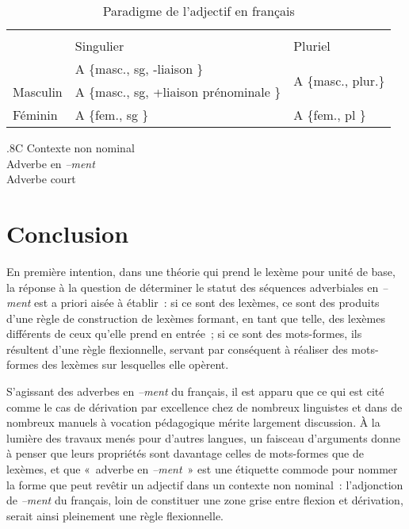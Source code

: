 \documentclass[output=paper]{langsci/langscibook}
\begin{document}
\begin{table}
  \centering
\begin{tabularx}{.8\textwidth}{Xll}
\lsptoprule
\multicolumn{3}{c}{Contexte nominal} \\
 & Singulier & Pluriel \\
\midrule
  & A \{masc., sg, -liaison \}& \multirow{2}{*}{A \{masc., plur.\}} \\
\multirow{-2}{*}{Masculin}& A \{masc., sg, +liaison prénominale \}& \\
\tablevspace
Féminin & A \{fem., sg \}& A \{fem., pl \} \\
\midrule
\end{tabularx}
\begin{tabularx}{.8\textwidth}{C}
\midrule
  Contexte non nominal \\
  \midrule
  Adverbe en \emph{--ment} \\
  Adverbe court \\
  \lspbottomrule
\end{tabularx}
\caption{Paradigme de l'adjectif en français}
\label{tab:Dal:4}
\end{table}

\section{Conclusion}

En première intention, dans une théorie qui prend le lexème pour unité de base, la réponse à la question de déterminer le statut des séquences adverbiales en \emph{--ment} est a priori aisée à établir~: si ce sont des lexèmes, ce sont des produits d'une règle de construction de lexèmes formant, en tant que telle, des lexèmes différents de ceux qu'elle prend en entrée~; si ce sont des mots-formes, ils résultent d'une règle flexionnelle, servant par conséquent à réaliser des mots-formes des lexèmes sur lesquelles elle opèrent.

S'agissant des adverbes en \emph{--ment} du français, il est apparu que ce qui est cité comme le cas de dérivation par excellence chez de nombreux linguistes et dans de nombreux manuels à vocation pédagogique mérite largement discussion. À la lumière des travaux menés pour d'autres langues, un faisceau d'arguments donne à penser que leurs propriétés sont davantage celles de mots-formes que de lexèmes, et que «~adverbe en \emph{--ment}~» est une étiquette commode pour nommer la forme que peut revêtir un adjectif dans un contexte non nominal~: l'adjonction de \emph{--ment} du français, loin de constituer une zone grise entre flexion et dérivation, serait ainsi pleinement une règle flexionnelle.
\end{document}
